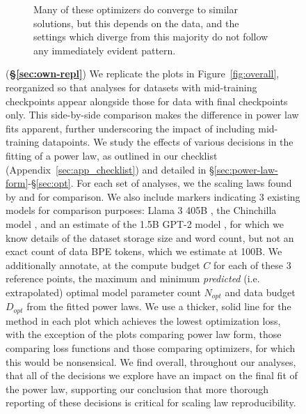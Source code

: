 \begin{figure}[]
\begin{subfigure}{\textwidth}
{%
Many of these optimizers do converge to similar solutions, but this depends on the data, and the settings which diverge from this majority do not follow any immediately evident pattern.} 
\label{fig:analysis_opt_app}
\end{subfigure}
\end{figure}

\begin{figure}[]
\ContinuedFloat
\centering 
\caption{(\textbf{\S\ref{sec:own-repl}}) We replicate the plots in Figure~\ref{fig:overall}, reorganized so that analyses for datasets with mid-training checkpoints appear alongside those for data with final checkpoints only. This side-by-side comparison makes the difference in power law fits apparent, further underscoring the impact of including mid-training datapoints.
We study the effects of various decisions in the fitting of a power law, as outlined in our checklist (Appendix~\ref{sec:app_checklist}) and detailed in \S\ref{sec:power-law-form}-\S\ref{sec:opt}. For each set of analyses, we the scaling laws found by \citep{kaplan2020scaling} and \citep{hoffmann2022training} for comparison. We also include markers indicating 3 existing models for comparison purposes: Llama 3 405B \citep{dubey2024llama}, the Chinchilla model \citep{hoffmann2022training}, and an estimate of the 1.5B GPT-2 model \citep{radford2019language}, for which we know details of the dataset storage size and word count, but not an exact count of data BPE tokens, which we estimate at 100B. We additionally annotate, at the compute budget $C$ for each of these 3 reference points, the maximum and minimum \textit{predicted} (i.e. extrapolated) optimal model parameter count $N_{opt}$ and data budget $D_{opt}$ from the fitted power laws. We use a thicker, solid line for the method in each plot which achieves the lowest optimization loss, with the exception of the plots comparing power law form, those comparing loss functions and those comparing optimizers, for which this would be nonsensical.
We find overall, throughout our analyses, that all of the decisions we explore have an impact on the final fit of the power law, supporting our conclusion that more thorough reporting of these decisions is critical for scaling law reproducibility.
}
\label{fig:app_mega}
\end{figure}
